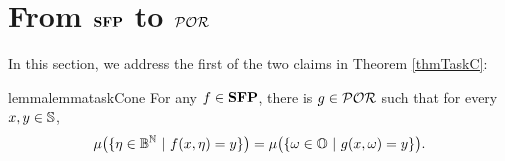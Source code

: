 














































































\section{From $\mathbf{SFP}$ to $\mathcal{POR}$}\label{sec:SFPtoPOR}
%
%

In this section, we address the first of the two claims in
Theorem \ref{thmTaskC}:

\begin{restatable}{lemma}{lemmataskCone}
\label{lemma:taskC1}
For any $f\in \mathbf{SFP}$, there is $g \in \mathcal{POR}$
such that for every $x,y\in \mathbb{S}$,
$$
\mu\big(\{\eta \in \mathbb{B}^{\mathbb{N}} \ | \ f(x, \eta)=y \}\big)
= \mu\big(\{\omega \in \mathbb{O} \ | \ g(x,\omega) =y\}\big).
$$
\end{restatable}

